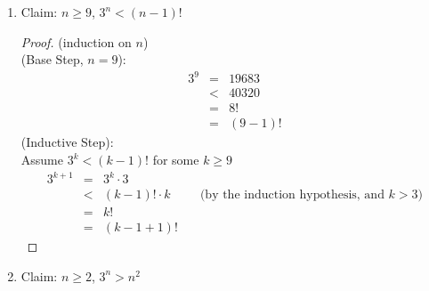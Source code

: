 \documentclass{article}
\begin{document}
\begin{enumerate}
\begin{enumerate}
\begin{proof}
            (induction on $n$) \\
            (Base Step, $n=2$):
            \begin{eqnarray}
                3^2 &=& 9 \\
                &>& 8 \\
                &=& 2^3 \\
                &=& 2^{2+1}
            \end{eqnarray}
            (Inductive Step): \\
            Assume $3^k > 2^{k+1}$ for some $k \geq 2$ \\
            \begin{eqnarray}
                3^{k+1} &=& 3^k \cdot 3^1 \\
                &=& 3^k \cdot 3 \\
                &>& 2^{k+1} \cdot 2 \hspace{1cm} \text{(by the induction hypothesis, and $3 > 2$)}\\
                &=& 2^{k+1+1}
            \end{eqnarray}
        \end{proof}
        \item Claim: $n \geq 9$, $3^n < (n-1)!$
        \begin{proof}
            (induction on $n$) \\
            (Base Step, $n=9$):
            \begin{eqnarray}
                3^9 &=& 19683 \\
                &<& 40320 \\
                &=& 8! \\
                &=& (9-1)!
            \end{eqnarray}
            (Inductive Step): \\
            Assume $3^k < (k-1)!$ for some $k \geq 9$
            \begin{eqnarray}
                3^{k+1} &=& 3^k \cdot 3 \\
                &<& (k-1)! \cdot k \hspace{1cm} \text{(by the induction hypothesis, and $k > 3$)}\\
                &=& k! \\
                &=& (k-1+1)!
            \end{eqnarray}
        \end{proof}
        \item Claim: $n \geq 2$, $3^n > n^2$

\end{enumerate}
\end{enumerate}
\end{document}
